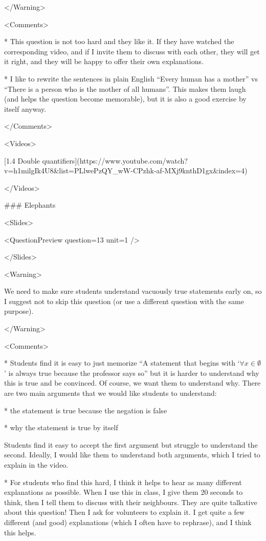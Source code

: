 </Warning>

<Comments>

*   This question is not too hard and they like it. If they have watched the corresponding video, and if I invite them to discuss with each other, they will get it right, and they will be happy to offer their own explanations.

*   I like to rewrite the sentences in plain English “Every human has a mother” vs “There is a person who is the mother of all humans”. This makes them laugh (and helps the question become memorable), but it is also a good exercise by itself anyway.

</Comments>

<Videos>

[1.4 Double quantifiers](https://www.youtube.com/watch?v=h1milgIk4U8\&list=PLlwePzQY_wW-CPzhk-af-MXj9knthD1gx\&index=4)

</Videos>

### Elephants

<Slides>

<QuestionPreview question={13} unit={1} />

</Slides>

<Warning>

We need to make sure students understand vacuously true statements early on, so I suggest not to skip this question (or use a different question with the same purpose).

</Warning>

<Comments>

*   Students find it is easy to just memorize “A statement that begins with ‘$\forall x \in \emptyset$’ is always true because the professor says so” but it is harder to understand why this is true and be convinced. Of course, we want them to understand why. There are two main arguments that we would like students to understand:

    *   the statement is true because the negation is false

    *   why the statement is true by itself

    Students find it easy to accept the first argument but struggle to understand the second. Ideally, I would like them to understand both arguments, which I tried to explain in the video.

*   For students who find this hard, I think it helps to hear as many different explanations as possible. When I use this in class, I give them 20 seconds to think, then I tell them to discuss with their neighbours. They are quite talkative about this question! Then I ask for volunteers to explain it. I get quite a few different (and good) explanations (which I often have to rephrase), and I think this helps.

